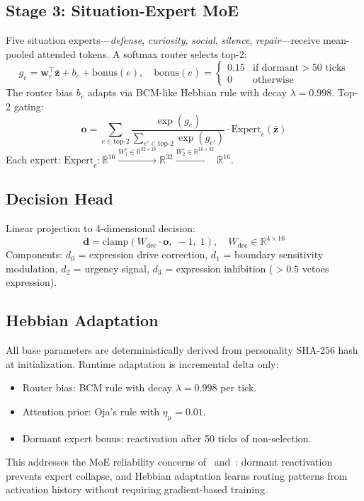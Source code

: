 \documentclass[11pt]{article}
\begin{document}
\subsection{Stage 3: Situation-Expert MoE}

Five situation experts---\emph{defense}, \emph{curiosity}, \emph{social}, \emph{silence}, \emph{repair}---receive mean-pooled attended tokens. A softmax router selects top-2:
\begin{equation}
g_e = \mathbf{w}_e^\top \bar{\mathbf{z}} + b_e + \text{bonus}(e), \quad \text{bonus}(e) = \begin{cases} 0.15 & \text{if dormant} > 50 \text{ ticks} \\ 0 & \text{otherwise} \end{cases}
\label{eq:moe-gating}
\end{equation}
The router bias $b_e$ adapts via BCM-like Hebbian rule with decay $\lambda = 0.998$. Top-2 gating:
\begin{equation}
\mathbf{o} = \sum_{e \in \text{top-2}} \frac{\exp(g_e)}{\sum_{e' \in \text{top-2}} \exp(g_{e'})} \cdot \text{Expert}_e(\bar{\mathbf{z}})
\end{equation}
Each expert: $\text{Expert}_e: \mathbb{R}^{16} \xrightarrow{W_1^e \in \mathbb{R}^{32 \times 16}} \mathbb{R}^{32} \xrightarrow{W_2^e \in \mathbb{R}^{16 \times 32}} \mathbb{R}^{16}$.

\subsection{Decision Head}

Linear projection to 4-dimensional decision:
\begin{equation}
\mathbf{d} = \text{clamp}(W_{\text{dec}} \cdot \mathbf{o},\; -1,\; 1), \quad W_{\text{dec}} \in \mathbb{R}^{4 \times 16}
\end{equation}
Components: $d_0$ = expression drive correction, $d_1$ = boundary sensitivity modulation, $d_2$ = urgency signal, $d_3$ = expression inhibition ($> 0.5$ vetoes expression).

\subsection{Hebbian Adaptation}

All base parameters are deterministically derived from personality SHA-256 hash at initialization. Runtime adaptation is incremental delta only:
\begin{itemize}
\item Router bias: BCM rule with decay $\lambda = 0.998$ per tick.
\item Attention prior: Oja's rule with $\eta_\mu = 0.01$.
\item Dormant expert bonus: reactivation after 50 ticks of non-selection.
\end{itemize}
This addresses the MoE reliability concerns of~\cite{misrouted2025} and~\cite{counterfactual2025}: dormant reactivation prevents expert collapse, and Hebbian adaptation learns routing patterns from activation history without requiring gradient-based training.
\end{document}
